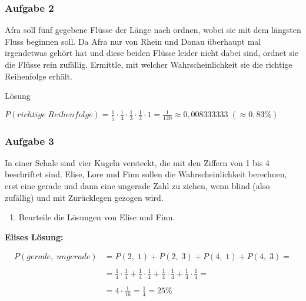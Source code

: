 \documentclass[
  ngerman,
]{book}
\providecommand{\tightlist}{%
  \setlength{\itemsep}{0pt}\setlength{\parskip}{0pt}}
\begin{document}
\hypertarget{aufgabe-2-16}{%
\subsubsection*{Aufgabe 2}\label{aufgabe-2-16}}

Afra soll fünf gegebene Flüsse der Länge nach ordnen, wobei sie mit dem längsten Fluss beginnen soll. Da Afra nur von Rhein und Donau überhaupt mal irgendetwas gehört hat und diese beiden Flüsse leider nicht dabei sind, ordnet sie die Flüsse rein zufällig. Ermittle, mit welcher Wahrscheinlichkeit sie die richtige Reihenfolge erhält.

Lösung

\(P(richtige\;Reihenfolge)=\frac{1}{5}\cdot\frac{1}{4}\cdot\frac{1}{3}\cdot\frac{1}{2}\cdot1 = \frac{1}{120} \approx 0,008333333 \; (\approx 0,83\%)\)

\hypertarget{section-157}{%
\subsubsection*{}\label{section-157}}

\hypertarget{aufgabe-3-10}{%
\subsubsection*{Aufgabe 3}\label{aufgabe-3-10}}

In einer Schale sind vier Kugeln versteckt, die mit den Ziffern von 1 bis 4 beschriftet sind. Elise, Lore und Finn sollen die Wahrscheinlichkeit berechnen, erst eine gerade und dann eine ungerade Zahl zu ziehen, wenn blind (also zufällig) und mit Zurücklegen gezogen wird.

\begin{enumerate}
\def\labelenumi{\alph{enumi})}
\tightlist
\item
  Beurteile die Lösungen von Elise und Finn.
\end{enumerate}

\textbf{Elises Lösung:}

\[\begin{align}
P(gerade,\;ungerade) &= P(2,\;1) + P(2,\;3) + P(4,\;1) + P(4,\;3) =\\
{}\\
&=\frac{1}{4} \cdot \frac{1}{4} + \frac{1}{4} \cdot \frac{1}{4} +\frac{1}{4} \cdot \frac{1}{4} + \frac{1}{4} \cdot \frac{1}{4} =\\
{}\\
& = 4\cdot \frac{1}{16} = \frac{1}{4} = 25\%
\end{align}\]
\end{document}
